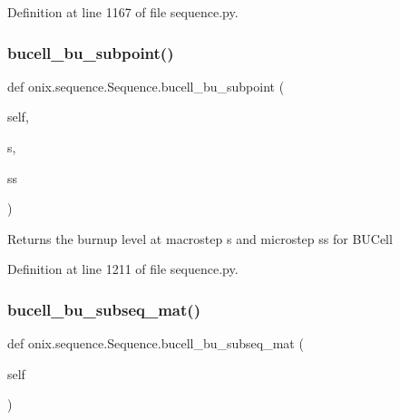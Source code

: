 Definition at line 1167 of file sequence.\+py.

\mbox{\label{classonix_1_1sequence_1_1Sequence_a17975d73f0999524afcfeae5a1fbb3ad}} 
\subsubsection{\texorpdfstring{bucell\+\_\+bu\+\_\+subpoint()}{bucell\_bu\_subpoint()}}
{\footnotesize\ttfamily def onix.\+sequence.\+Sequence.\+bucell\+\_\+bu\+\_\+subpoint (\begin{DoxyParamCaption}\item[{}]{self,  }\item[{}]{s,  }\item[{}]{ss }\end{DoxyParamCaption})}

\begin{DoxyVerb}Returns the burnup level at macrostep s and microstep ss for BUCell\end{DoxyVerb}
 

Definition at line 1211 of file sequence.\+py.

\mbox{\label{classonix_1_1sequence_1_1Sequence_a263ba1d4cdb10ad54d6dfeff4f60f875}} 
\subsubsection{\texorpdfstring{bucell\+\_\+bu\+\_\+subseq\+\_\+mat()}{bucell\_bu\_subseq\_mat()}\hspace{0.1cm}{\footnotesize\ttfamily [1/2]}}
{\footnotesize\ttfamily def onix.\+sequence.\+Sequence.\+bucell\+\_\+bu\+\_\+subseq\+\_\+mat (\begin{DoxyParamCaption}\item[{}]{self }\end{DoxyParamCaption})}

